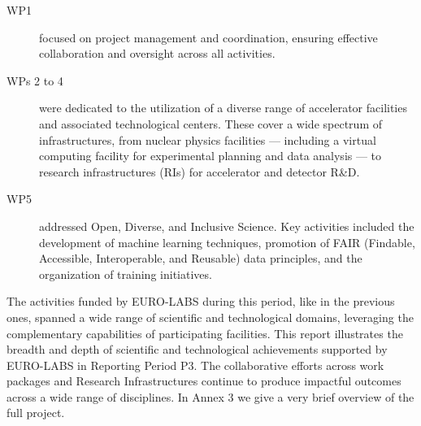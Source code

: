 \begin{description}
    \item[WP1] focused on project management and coordination, ensuring effective collaboration and oversight across all activities.
    
    \item[WPs 2 to 4] were dedicated to the utilization of a diverse range of accelerator facilities and associated technological centers. These cover a wide spectrum of infrastructures, from nuclear physics facilities --- including a virtual computing facility for experimental planning and data analysis --- to research infrastructures (RIs) for accelerator and detector R\&D.
    
    \item[WP5] addressed Open, Diverse, and Inclusive Science. Key activities included the development of machine learning techniques, promotion of FAIR (Findable, Accessible, Interoperable, and Reusable) data principles, and the organization of training initiatives.
\end{description}

The activities funded by EURO-LABS during this period, like in the previous ones, spanned a wide range of scientific and technological domains, leveraging the complementary capabilities of participating facilities. This report illustrates the breadth and depth of scientific and technological achievements supported by EURO-LABS in Reporting Period P3. The collaborative efforts across work packages and Research Infrastructures continue to produce impactful outcomes across a wide range of disciplines. In Annex 3 we give a very brief overview of the full project.



    
    
